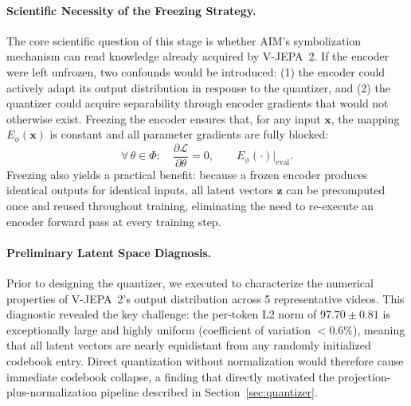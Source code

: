 \documentclass{article}
\begin{document}
\paragraph{Scientific Necessity of the Freezing Strategy.}
The core scientific question of this stage is whether AIM's symbolization
mechanism can read knowledge already acquired by V-JEPA~2.  If the encoder were
left unfrozen, two confounds would be introduced: (1) the encoder could
actively adapt its output distribution in response to the quantizer, and
(2) the quantizer could acquire separability through encoder gradients that
would not otherwise exist.  Freezing the encoder ensures that, for any input
$\mathbf{x}$, the mapping $E_\phi(\mathbf{x})$ is constant and all parameter
gradients are fully blocked:
%
\begin{equation}
  \forall\,\theta \in \Phi:\quad
  \frac{\partial \mathcal{L}}{\partial \theta} = 0,
  \qquad E_\phi(\cdot)\big|_{\text{eval}}.
\end{equation}
%
Freezing also yields a practical benefit: because a frozen encoder produces
identical outputs for identical inputs, all latent vectors $\mathbf{z}$ can be
precomputed once and reused throughout training, eliminating the need to
re-execute an encoder forward pass at every training step.

\paragraph{Preliminary Latent Space Diagnosis.}
Prior to designing the quantizer, we executed
 to characterize the numerical
properties of V-JEPA~2's output distribution across 5
representative videos.  This diagnostic revealed the key
challenge: the per-token L2 norm of $97.70 \pm 0.81$ is
exceptionally large and highly uniform (coefficient of
variation $< 0.6\%$), meaning that all latent vectors are
nearly equidistant from any randomly initialized codebook
entry.  Direct quantization without normalization would
therefore cause immediate codebook collapse, a finding that
directly motivated the projection-plus-normalization pipeline
described in Section~\ref{sec:quantizer}.
\end{document}
